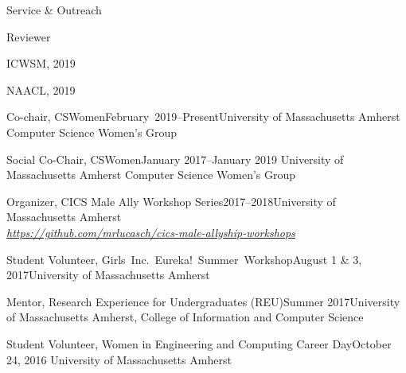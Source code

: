 \documentclass{resume} %
\begin{document}

\begin{rSection}{Service \& Outreach}

\begin{rSubsection}{Reviewer}{}{}{}
\item ICWSM, 2019
\item NAACL, 2019
\end{rSubsection}

\begin{rrSubsection}
{Co-chair, CSWomen}{February~2019--Present}{University of Massachusetts Amherst Computer Science Women's Group}{}
\end{rrSubsection}

\begin{rrSubsection}{Social Co-Chair,  CSWomen}{January 2017--January 2019}
{University of Massachusetts Amherst Computer Science Women's Group}{}
\end{rrSubsection}

\begin{rrSubsection}{Organizer, CICS Male Ally Workshop Series}{2017--2018}{University of Massachusetts Amherst \\}
{\emph{\url{https://github.com/mrlucasch/cics-male-allyship-workshops}}}
\end{rrSubsection}


\begin{rrSubsection}{Student Volunteer, Girls~Inc.~Eureka!~Summer~Workshop}{August 1 \& 3, 2017}{University of Massachusetts Amherst}{}
\end{rrSubsection}

\begin{rrSubsection}{Mentor, Research Experience for Undergraduates (REU)}{Summer 2017}{University of Massachusetts Amherst, College of Information and Computer Science}{}
\end{rrSubsection}



\begin{rrSubsection}{Student Volunteer, Women in Engineering and Computing Career Day}{October 24, 2016}
{University of Massachusetts Amherst \\
}{}
\end{rrSubsection}

\end{rSection}
\end{document}
